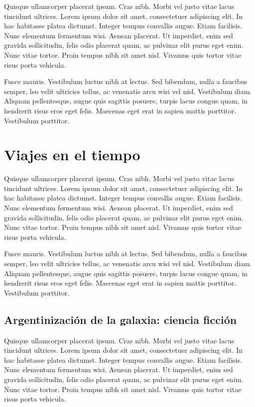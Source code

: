 Quisque ullamcorper placerat ipsum. Cras nibh. Morbi vel justo vitae lacus tincidunt ultrices. Lorem ipsum dolor sit amet, consectetuer adipiscing elit. In hac habitasse platea dictumst. Integer tempus convallis augue. Etiam facilisis. Nunc elementum fermentum wisi. Aenean placerat. Ut imperdiet, enim sed gravida sollicitudin, felis odio placerat quam, ac pulvinar elit purus eget enim. Nunc vitae tortor. Proin tempus nibh sit amet nisl. Vivamus quis tortor vitae risus porta vehicula.

Fusce mauris. Vestibulum luctus nibh at lectus. Sed bibendum, nulla a faucibus semper, leo velit ultricies tellus, ac venenatis arcu wisi vel nisl. Vestibulum diam. Aliquam pellentesque, augue quis sagittis posuere, turpis lacus congue quam, in hendrerit risus eros eget felis. Maecenas eget erat in sapien mattis porttitor. Vestibulum porttitor.

\chapter{Viajes en el tiempo}

Quisque ullamcorper placerat ipsum. Cras nibh. Morbi vel justo vitae lacus tincidunt ultrices. Lorem ipsum dolor sit amet, consectetuer adipiscing elit. In hac habitasse platea dictumst. Integer tempus convallis augue. Etiam facilisis. Nunc elementum fermentum wisi. Aenean placerat. Ut imperdiet, enim sed gravida sollicitudin, felis odio placerat quam, ac pulvinar elit purus eget enim. Nunc vitae tortor. Proin tempus nibh sit amet nisl. Vivamus quis tortor vitae risus porta vehicula.

Fusce mauris. Vestibulum luctus nibh at lectus. Sed bibendum, nulla a faucibus semper, leo velit ultricies tellus, ac venenatis arcu wisi vel nisl. Vestibulum diam. Aliquam pellentesque, augue quis sagittis posuere, turpis lacus congue quam, in hendrerit risus eros eget felis. Maecenas eget erat in sapien mattis porttitor. Vestibulum porttitor.

\section{Argentinización de la galaxia: ciencia ficción}

Quisque ullamcorper placerat ipsum. Cras nibh. Morbi vel justo vitae lacus tincidunt ultrices. Lorem ipsum dolor sit amet, consectetuer adipiscing elit. In hac habitasse platea dictumst. Integer tempus convallis augue. Etiam facilisis. Nunc elementum fermentum wisi. Aenean placerat. Ut imperdiet, enim sed gravida sollicitudin, felis odio placerat quam, ac pulvinar elit purus eget enim. Nunc vitae tortor. Proin tempus nibh sit amet nisl. Vivamus quis tortor vitae risus porta vehicula.


